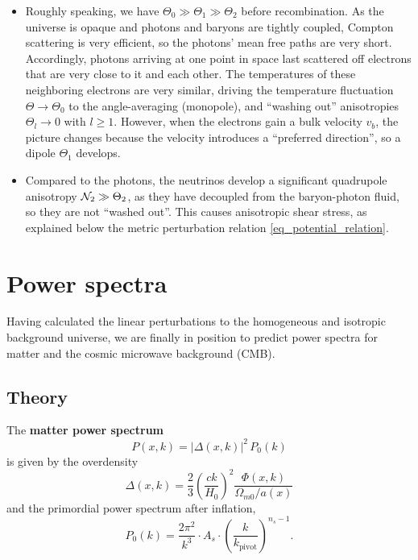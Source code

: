 \documentclass[10pt,a4paper]{article}
\begin{document}
\begin{itemize}
\item
Roughly speaking, we have $\Theta_0 \gg \Theta_1 \gg \Theta_2$ before recombination.
As the universe is opaque and photons and baryons are tightly coupled,
Compton scattering is very efficient, so the photons' mean free paths are very short.
Accordingly, photons arriving at one point in space last scattered off electrons that are very close to it and each other.
The temperatures of these neighboring electrons are very similar,
driving the temperature fluctuation $\Theta \rightarrow \Theta_0$
to the angle-averaging (monopole),
and ``washing out'' anisotropies $\Theta_l \rightarrow 0$ with $l \geq 1$.
However, when the electrons gain a bulk velocity $v_b$,
the picture changes because the velocity introduces a ``preferred direction'',
so a dipole $\Theta_1$ develops.

\item
Compared to the photons, the neutrinos develop a significant quadrupole anisotropy $\mathcal{N}_2 \gg \Theta_2$,
as they have decoupled from the baryon-photon fluid, so they are not ``washed out''.
This causes anisotropic shear stress, as explained below the metric perturbation relation \eqref{eq_potential_relation}.
\end{itemize}

\clearpage
\section{Power spectra}
\label{sec_power_spectra}

Having calculated the linear perturbations to the homogeneous and isotropic background universe,
we are finally in position to predict power spectra for matter and the cosmic microwave background (CMB).

\subsection{Theory}

The \textbf{matter power spectrum}
\begin{equation}
	P(x,k) = |\Delta(x,k)|^2 \, P_0(k)
\label{eq_Pk}
\end{equation}
is given by the overdensity
\begin{equation}
	\Delta(x,k) = \frac23 \left( \frac{ck}{H_0} \right)^2 \frac{\Phi(x,k)}{\Omega_{m0}/a(x)}
\end{equation}
and the primordial power spectrum after inflation,
\begin{equation}
	P_0(k) = \frac{2\pi^2}{k^3} \cdot A_s \cdot \left( \frac{k}{k_\text{pivot}} \right)^{n_s-1}.
\label{eq_P_primordial}
\end{equation}
\end{document}

